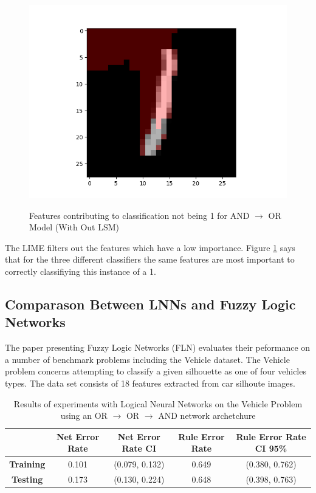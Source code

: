 \begin{figure}[H]
\begin{minipage}[b]{0.33\textwidth}
		\includegraphics[width=\textwidth]{LIME/MLPN.png}
		\label{}
	\end{minipage}
	\caption{Features contributing to classification not being 1 for AND $\rightarrow$ OR Model (With Out LSM)}
	\label{fig:and-or-lnn-with-lsm-like}
\end{figure}

The LIME filters out the features which have a low importance. Figure \ref{fig:and-or-lnn-with-lsm-like} says that for the three different classifiers the same features are most important to correctly classifiying this instance of a 1. 

\subsection{Comparason Between LNNs and Fuzzy Logic Networks}
The paper presenting Fuzzy Logic Networks (FLN) evaluates their peformance on a number of benchmark problems including the Vehicle \cite{Lichman:2013} dataset. The Vehicle problem concerns attempting to classify a given silhouette as one of four vehicles types. The data set consists of 18 features extracted from car silhoute images.\\

\begin{table}[H]
	\begin{center}
		\begin{tabular}{| c | c | c | c | c |}
			\hline
			\textbf{} & \textbf{Net Error Rate} & \textbf{Net Error Rate CI} & \textbf{Rule Error Rate} & \textbf{Rule Error Rate CI 95\%}\\
			\hline
			\hline
			\textbf{Training} & 0.101 & (0.079, 0.132) & 0.649 & (0.380, 0.762)\\
			\textbf{Testing} & 0.173 & (0.130, 0.224) & 0.648 & (0.398, 0.763)\\
			\hline
		\end{tabular}
	\end{center}
	\caption{Results of experiments with Logical Neural Networks on the Vehicle Problem using an OR $\rightarrow$ OR $\rightarrow$ AND network archetchure}
	\label{tab:vehicle-lnn-peformance}
\end{table}

